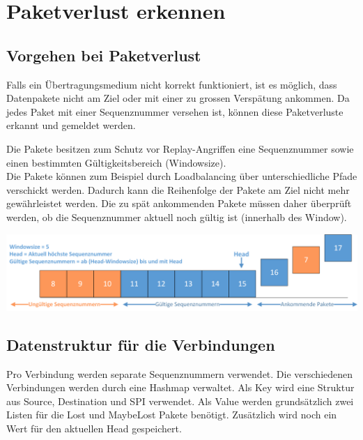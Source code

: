 \section{Paketverlust erkennen}
\label{sec:Paketverlust erkennen}

\subsection{Vorgehen bei Paketverlust}

Falls ein Übertragungsmedium nicht korrekt funktioniert, ist es möglich, dass Datenpakete nicht am Ziel oder mit einer zu grossen Verspätung ankommen.
Da jedes \esp{} Paket mit einer Sequenznummer versehen ist, können diese Paketverluste erkannt und gemeldet werden.

Die \esp{} Pakete besitzen zum Schutz vor Replay-Angriffen eine Sequenznummer sowie einen bestimmten Gültigkeitsbereich (Windowsize).\\
Die Pakete können zum Beispiel durch Loadbalancing \"{u}ber unterschiedliche Pfade verschickt werden. Dadurch kann die Reihenfolge der Pakete am Ziel nicht mehr gewährleistet werden. Die zu spät ankommenden Pakete müssen daher überprüft werden, ob die Sequenznummer aktuell noch gültig ist (innerhalb des Window).


\includegraphics[width=1\textwidth]{start/img/Sequenznummern.png}

\subsection{Datenstruktur für die \esp Verbindungen}
Pro Verbindung werden separate Sequenznummern verwendet. Die verschiedenen Verbindungen werden durch eine Hashmap verwaltet. Als Key wird eine Struktur aus Source, Destination und \acs{SPI} verwendet. Als Value werden grundsätzlich zwei Listen für die Lost und MaybeLost Pakete benötigt. Zusätzlich wird noch ein Wert für den aktuellen Head gespeichert.


